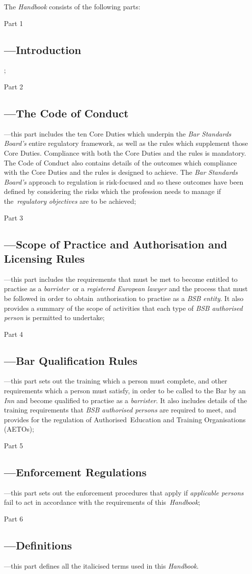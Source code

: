 The \emph{Handbook} consists of the following parts:
\begin{numlist}\item Part 1 \subsection{---Introduction};
\item Part 2 \subsection{---The Code of Conduct} ---this part includes the ten
Core Duties which underpin the \emph{Bar Standards Board's} entire
regulatory framework, as well as the rules which supplement those Core
Duties. Compliance with both the Core Duties and the rules is mandatory.
The Code of Conduct also contains details of the outcomes which
compliance with the Core Duties and the rules is designed to achieve.
The \emph{Bar Standards Board's} approach to regulation is risk-focused
and so these outcomes have been defined by considering the risks which
the profession needs to manage if the~\emph{regulatory objectives} are
to be achieved;
\item Part 3 \subsection{---Scope of Practice and Authorisation and Licensing
Rules} ---this part includes the requirements that must be met to become
entitled to practise as a \emph{barrister~}or a \emph{registered
\emph{European lawyer}} and the process that must be followed in order
to obtain~authorisation to practise as a \emph{BSB entity}. It also
provides a summary of the scope of activities that each type of
\emph{BSB authorised person} is permitted to undertake;
\item Part 4 \subsection{---Bar Qualification Rules} ---this part sets out the
training which a person must complete, and other requirements which a
person must satisfy, in order to be called to the Bar by an \emph{Inn}
and become qualified to practise as a \emph{barrister}. It also includes
details of the training requirements that \emph{BSB authorised persons}
are required to meet, and provides for the regulation of
Authorised~Education and Training Organisations (AETOs);
\item Part 5 \subsection{---Enforcement Regulations} ---this part sets out the
enforcement procedures that apply if \emph{applicable persons} fail to
act in accordance with the requirements of this~\emph{Handbook};
\item Part 6 \subsection{---Definitions} ---this part defines all the
italicised terms used in this \emph{Handbook}.
\end{numlist}
